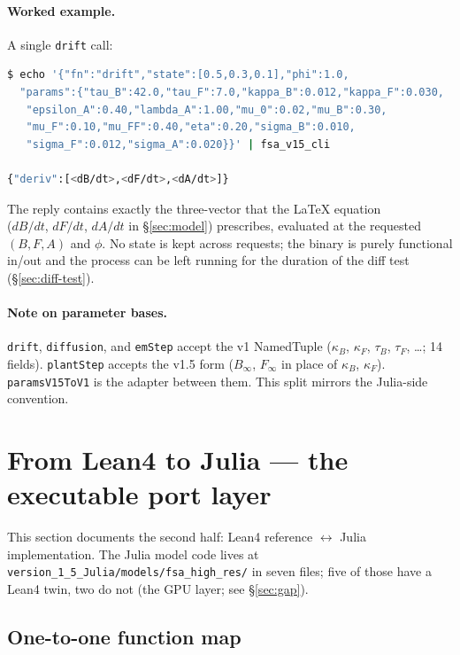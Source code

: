 \documentclass[11pt,a4paper]{article}
\begin{document}
\paragraph{Worked example.} A single \texttt{drift} call:

\begin{lstlisting}[language=bash]
$ echo '{"fn":"drift","state":[0.5,0.3,0.1],"phi":1.0,
  "params":{"tau_B":42.0,"tau_F":7.0,"kappa_B":0.012,"kappa_F":0.030,
   "epsilon_A":0.40,"lambda_A":1.00,"mu_0":0.02,"mu_B":0.30,
   "mu_F":0.10,"mu_FF":0.40,"eta":0.20,"sigma_B":0.010,
   "sigma_F":0.012,"sigma_A":0.020}}' | fsa_v15_cli

{"deriv":[<dB/dt>,<dF/dt>,<dA/dt>]}
\end{lstlisting}

The reply contains exactly the three-vector that the LaTeX equation
\\($dB/dt$, $dF/dt$, $dA/dt$ in \S\ref{sec:model}) prescribes,
evaluated at the requested $(B, F, A)$ and $\phi$. No state is kept
across requests; the binary is purely functional in/out and the
process can be left running for the duration of the diff test
(\S\ref{sec:diff-test}).

\paragraph{Note on parameter bases.} \texttt{drift}, \texttt{diffusion},
and \texttt{emStep} accept the v1 NamedTuple
($\kappa_B$, $\kappa_F$, $\tau_B$, $\tau_F$, \ldots; 14 fields).
\texttt{plantStep} accepts the v1.5 form ($B_\infty$, $F_\infty$ in
place of $\kappa_B$, $\kappa_F$). \texttt{paramsV15ToV1} is the
adapter between them. This split mirrors the Julia-side convention.


\section{From Lean4 to Julia --- the executable port layer}
\label{sec:julia-port}

This section documents the second half: Lean4 reference $\leftrightarrow$
Julia implementation. The Julia model code lives at
\texttt{version\_1\_5\_Julia/models/fsa\_high\_res/} in seven files;
five of those have a Lean4 twin, two do not (the GPU layer; see
\S\ref{sec:gap}).

\subsection{One-to-one function map}
\end{document}
